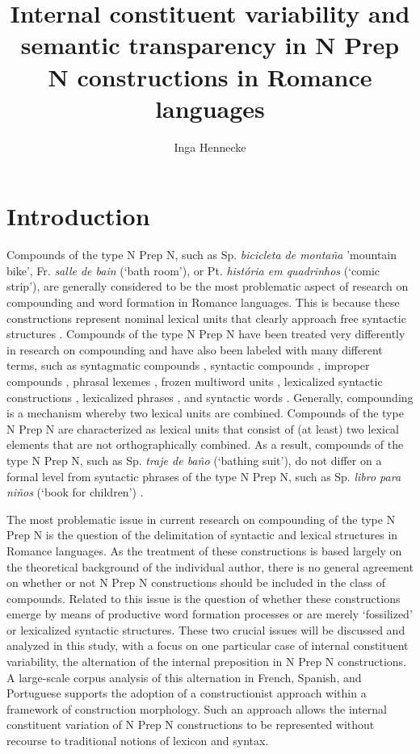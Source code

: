 \documentclass[output=paper]{langsci/langscibook}
\title{Internal constituent variability and semantic transparency in N Prep N constructions in Romance languages}
\author{Inga Hennecke\affiliation{University of Tübingen}}
\begin{document}
\maketitle
\section{Introduction} 
Compounds of the type N Prep N, such as Sp. \textit{bicicleta de montaña} 'mountain bike', Fr. \textit{salle de bain} (`bath room'), or Pt. \textit{história em quadrinhos} (`comic strip'), are generally considered to be the most problematic aspect of research on compounding and word formation in Romance languages. This is because these constructions represent nominal lexical units that clearly approach free syntactic structures \citep{BustosGisbert:1986}. Compounds of the type N Prep N have been treated very differently in research on compounding and have also been labeled with many different terms, such as syntagmatic compounds \citep{BuenafuentesdelaMata:2010}, syntactic compounds \citep{RioTorto:2009}, improper compounds \citep{Kornfeld:2009}, phrasal lexemes \citep{Masini:2007}, frozen multiword units \citep{Guevara:2012}, lexicalized syntactic constructions \citep{Villoing:2012}, lexicalized phrases \citep{Fradin:2009}, and syntactic words \citep{DiSciullo:1987}. Generally, compounding is a mechanism whereby two lexical units are combined. Compounds of the type N Prep N are characterized as lexical units that consist of (at least) two lexical elements that are not orthographically combined. As a result, compounds of the type N Prep N, such as Sp. \textit{traje de baño} (`bathing suit'), do not differ on a formal level from syntactic phrases of the type N Prep N, such as Sp. \textit{libro para niños} (`book for children') \citep[69]{BustosGisbert:1986}.

The most problematic issue in current research on compounding of the type N Prep N is the question of the delimitation of syntactic and lexical structures in Romance languages. As the treatment of these constructions is based largely on the theoretical background of the individual author, there is no general agreement on whether or not N Prep N constructions should be included in the class of compounds. Related to this issue is the question of whether these constructions emerge by means of productive word formation processes or are merely `fossilized' or lexicalized syntactic structures. These two crucial issues will be discussed and analyzed in this study, with a focus on one particular case of internal constituent variability, the alternation of the internal preposition in N Prep N constructions. A large-scale corpus analysis of this alternation in French, Spanish, and Portuguese supports the adoption of a constructionist approach within a framework of construction morphology. Such an approach allows the internal constituent variation of N Prep N constructions to be represented without recourse to traditional notions of lexicon and syntax.
\end{document}
